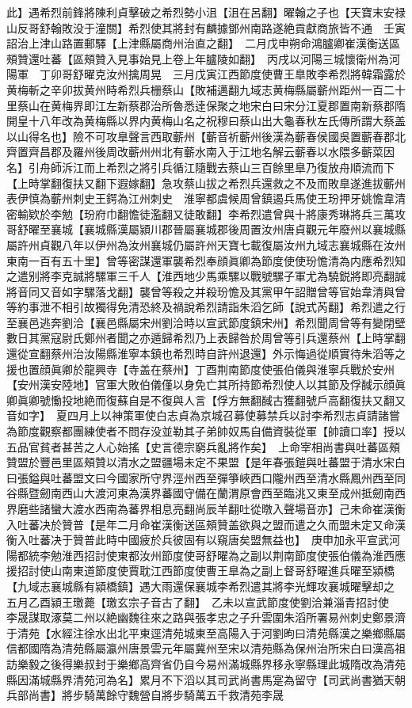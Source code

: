 此】遇希烈前鋒將陳利貞擊破之希烈勢小沮【沮在呂翻】曜翰之子也【天寶末安禄山反哥舒翰敗没于潼關】希烈使其將封有麟據鄧州南路遂絶貢獻商旅皆不通　壬寅詔治上津山路置郵驛【上津縣屬商州治直之翻】　二月戊申朔命鴻臚卿崔漢衡送區頰贊還吐蕃【區頰贊入見事始見上卷上年臚陵如翻】　丙戌以河陽三城懷衛州為河陽軍　丁卯哥舒曜克汝州擒周晃　三月戊寅江西節度使曹王臯敗李希烈將韓霜露於黄梅斬之辛卯拔黄州時希烈兵栅蔡山【敗補邁翻九域志黄梅縣屬蘄州距州一百二十里蔡山在黄梅界即江左新蔡郡治所魯悉逹保聚之地宋白曰宋分江夏郡置南新蔡郡隋開皇十八年改為黄梅縣以界内黄梅山名之祝穆曰蔡山出大龜春秋左氏傳所謂大蔡盖以山得名也】險不可攻臯聲言西取蘄州【蘄音祈蘄州後漢為蘄春侯國吳置蘄春郡北齊置齊昌郡及羅州後周改蘄州州北有蘄水南入于江地名解云蘄春以水隈多蘄菜因名】引舟師泝江而上希烈之將引兵循江隨戰去蔡山三百餘里臯乃復放舟順流而下【上時掌翻復扶又翻下遐嫁翻】急攻蔡山拔之希烈兵還救之不及而敗臯遂進拔蘄州表伊慎為蘄州刺史王鍔為江州刺史　淮寧都虞候周曾鎮遏兵馬使王玢押牙姚憺韋清密輸欵於李勉【玢府巾翻憺徒濫翻又徒敢翻】李希烈遣曾與十將康秀琳將兵三萬攻哥舒曜至襄城【襄城縣漢屬潁川郡晉屬襄城郡後周置汝州唐貞觀元年廢州以襄城縣屬許州貞觀八年以伊州為汝州襄城仍屬許州天寶七載復屬汝州九域志襄城縣在汝州東南一百有五十里】曾等密謀還軍襲希烈奉顔眞卿為節度使使玢憺清為内應希烈知之遣别將李克誠將騾軍三千人【淮西地少馬乘騾以戰號騾子軍尤為驍鋭將即亮翻誠將音同又音如字騾落戈翻】襲曾等殺之并殺玢憺及其黨甲午詔贈曾等官始韋清與曾等約事泄不相引故獨得免清恐終及禍說希烈請詣朱滔乞師【說式芮翻】希烈遣之行至襄邑逃奔劉洽【襄邑縣屬宋州劉洽時以宣武節度鎮宋州】希烈聞周曾等有變閉壁數日其黨寇尉氏鄭州者聞之亦遁歸希烈乃上表歸咎於周曾等引兵還蔡州【上時掌翻還從宣翻蔡州治汝陽縣淮寧本鎮也希烈時自許州退還】外示悔過從順實待朱滔等之援也置顔眞卿於龍興寺【寺盖在蔡州】丁酉荆南節度使張伯儀與淮寧兵戰於安州【安州漢安陸地】官軍大敗伯儀僅以身免亡其所持節希烈使人以其節及俘馘示顔眞卿眞卿號慟投地絶而復蘇自是不復與人言【俘方無翻馘古獲翻號戶高翻復扶又翻又音如字】　夏四月上以神策軍使白志貞為京城召募使募禁兵以討李希烈志貞請諸嘗為節度觀察都團練使者不問存没並勒其子弟帥奴馬自備資裝從軍【帥讀口率】授以五品官貧者甚苦之人心始搖【史言德宗窮兵亂將作矣】　上命宰相尚書與吐蕃區頰贊盟於豐邑里區頰贊以清水之盟疆場未定不果盟【是年春張鎧與吐蕃盟于清水宋白曰張鎰與吐蕃盟文曰今國家所守界涇州西至彈箏峽西口隴州西至清水縣鳳州西至同谷縣暨劒南西山大渡河東為漢界蕃國守備在蘭渭原會西至臨洮又東至成州抵劒南西界磨些諸蠻大渡水西南為蕃界相息亮翻尚辰羊翻吐從暾入聲場音亦】己未命崔漢衡入吐蕃决於贊普【是年二月命崔漢衡送區頰贊盖欲與之盟而遣之久而盟未定又命漢衡入吐蕃决于贊普此時中國疲於兵彼固有以窺唐矣盟無益也】　庚申加永平宣武河陽都統李勉淮西招討使東都汝州節度使哥舒曜為之副以荆南節度使張伯儀為淮西應援招討使山南東道節度使賈耽江西節度使曹王臯為之副上督哥舒曜進兵曜至潁橋【九域志襄城縣有潁橋鎮】遇大雨還保襄城李希烈遣其將李光輝攻襄城曜擊却之　五月乙酉潁王璬薨【璬玄宗子音古了翻】　乙未以宣武節度使劉洽兼淄青招討使　李晟謀取涿莫二州以絶幽魏往來之路與張孝忠之子升雲圍朱滔所署易州刺史鄭景濟于清苑【水經注徐水出北平東逕清苑城東至高陽入于河劉昫曰清苑縣漢之樂鄉縣屬信都國隋為清苑縣屬瀛州唐景雲元年屬冀州至宋以清苑縣為保州治所宋白曰漢高祖訪樂毅之後得樂叔封于樂鄉高齊省仍自今易州滿城縣界移永寧縣理此城隋改為清苑縣因滿城縣界清苑河為名】累月不下滔以其司武尚書馬寔為留守【司武尚書猶天朝兵部尚書】將步騎萬餘守魏營自將步騎萬五千救清苑李晟